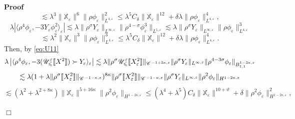 \documentclass[a4paper,11pt]{article}
\newenvironment{proof}{\noindent\textbf{Proof\ }}{\hspace*{\fill}$\Box$\medskip}
\numberwithin{equation}{section}
\newcommand{\CC}{\mathscr{C} \hspace{.1em}}
\newcommand{\UU}{\mathscr{U}}
\begin{document}
\begin{proof}
    \begin{equation}\label{eq:Y2}
     \lesssim \lambda^3 \|\mathbb{X}_{\varepsilon} \|^6  \| \rho
     \phi_{\varepsilon} \|^2_{L^{4, \varepsilon}} \leqslant \lambda^5
     C_{\delta} \|\mathbb{X}_{\varepsilon} \|^{12} + \delta \lambda \| \rho
     \phi_{\varepsilon} \|_{L^{4, \varepsilon}}^4, 
     \end{equation}
  \[ \lambda | \langle \rho^4 \phi_{\varepsilon}, - 3 Y_{\varepsilon}
     \phi_{\varepsilon}^2 \rangle_{\varepsilon} | \lesssim \lambda \|
     \rho^{\sigma} Y_{\varepsilon} \|_{L^{\infty, \varepsilon}}  \| \rho^{4 -
     \sigma} \phi_{\varepsilon}^3 \|_{L^{1, \varepsilon}} \lesssim \lambda \|
     \rho^{\sigma} Y_{\varepsilon} \|_{L^{\infty, \varepsilon}}  \| \rho
     \phi_{\varepsilon} \|^3_{L^{4, \varepsilon}} \]
  \begin{equation}\label{eq:Y11}
   \lesssim \lambda^2 \|\mathbb{X}_{\varepsilon} \|^3  \| \rho
     \phi_{\varepsilon} \|_{L^{4, \varepsilon}}^3 \leqslant \lambda^5
     C_{\delta} \|\mathbb{X}_{\varepsilon} \|^{12} + \delta \lambda \| \rho
     \phi_{\varepsilon} \|_{L^{4, \varepsilon}}^4 .
     \end{equation}
  Then, by {\eqref{eq:U11}}
  \[ \lambda \left| \langle \rho^4 \phi_{\varepsilon}, - 3
     (\UU^{\varepsilon}_{\leqslant} \llbracket X^2 \rrbracket) \succ
     Y_{\varepsilon} \rangle_{\varepsilon} \right| \lesssim \lambda \|
     \rho^{\sigma} \UU^{\varepsilon}_{\leqslant} \llbracket X_{\varepsilon}^2
     \rrbracket \|_{\CC^{- 1 + 3 \kappa, \varepsilon}} \| \rho^{\sigma}
     Y_{\varepsilon} \|_{L^{\infty, \varepsilon}}  \| \rho^{4 - 3 \sigma}
     \phi_{\varepsilon} \|_{B^{1 - 3 \kappa, \varepsilon}_{1, 1}} \]
  \[ \lesssim \lambda (1 + \lambda \| \rho^{\sigma} \llbracket
     X_{\varepsilon}^2 \rrbracket \|_{\CC^{- 1 - \kappa, \varepsilon}})^{8
     \kappa}  \| \rho^{\sigma} \llbracket X_{\varepsilon}^2 \rrbracket
     \|_{\CC^{- 1 - \kappa, \varepsilon}} \| \rho^{\sigma} Y_{\varepsilon}
     \|_{L^{\infty, \varepsilon}}  \| \rho^2 \phi_{\varepsilon} \|_{H^{1 - 2
     \kappa, \varepsilon}} \]
  \begin{equation}\label{eq:U0}
   \lesssim (\lambda^{2} + \lambda^{2 + 8 \kappa}) \|\mathbb{X}_{\varepsilon}
     \|^{5 + 16 \kappa}  \| \rho^2 \phi_{\varepsilon} \|_{H^{1 - 2 \kappa,
     \varepsilon}} \leqslant (\lambda^4 + \lambda^5) C_{\delta}
     \|\mathbb{X}_{\varepsilon} \|^{10 + \vartheta} + \delta \| \rho^2
     \phi_{\varepsilon} \|_{H^{1 - 2 \kappa, \varepsilon}}^2,
     \end{equation}

\end{proof}
\end{document}

